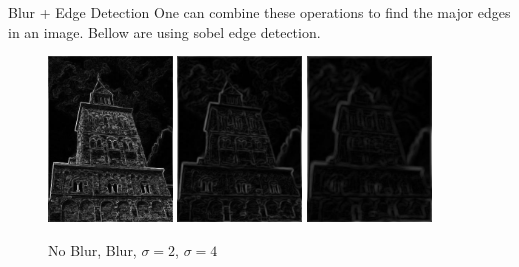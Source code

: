 \documentclass{beamer}
\begin{document}
\begin{frame}{Blur + Edge Detection}
One can combine these operations to find the major edges in an image. Bellow are using sobel edge detection.

\begin{figure}[ht]
\includegraphics[width=1.3in]{churchout.jpg}
\hspace{.1in} 
\includegraphics[width=1.3in]{churchoutbluredge.jpg}
\hspace{.1in}
\includegraphics[width=1.3in]{churchoutblur2edge.jpg}
\hspace{.1in}
\caption{No Blur, Blur, $\sigma = 2$, $\sigma = 4$}
\end{figure}

\end{frame}
\end{document}
